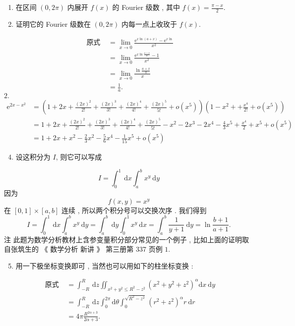 \documentclass[10pt]{article}
\begin{document}
\begin{enumerate}
  \item  在区间  $(0,2 \pi)$  内展开  $f(x)$  的  Fourier  级数 ,  其中  $f(x)=\frac{\pi-x}{2}$.

  \item  证明它的  Fourier  级数在  $(0,2 \pi)$  内每一点上收玫于  $f(x)$.

\end{enumerate}
$$
\begin{aligned}
\text { 原式 } &=\lim _{x \rightarrow 0} \frac{\mathrm{e}^{x \ln (a+x)}-\mathrm{e}^{x \ln }}{x^{2}} \\
&=\lim _{x \rightarrow 0} \frac{\mathrm{e}^{x \ln \frac{a+x}{a}}-1}{x^{2}} \\
&=\lim _{x \rightarrow 0} \frac{\ln \frac{a+x}{a}}{x} \\
&=\frac{1}{a} .
\end{aligned}
$$
$2 .$
$$
\begin{aligned}
\mathrm{e}^{2 x-x^{2}} &=\left(1+2 x+\frac{(2 x)^{2}}{2 !}+\frac{(2 x)^{3}}{3 !}+\frac{(2 x)^{4}}{4 !}+\frac{(2 x)^{5}}{5 !}+o\left(x^{5}\right)\right)\left(1-x^{2}++\frac{x^{4}}{2 !}+o\left(x^{5}\right)\right) \\
&=1+2 x+\frac{(2 x)^{2}}{2 !}+\frac{(2 x)^{3}}{3 !}+\frac{(2 x)^{4}}{4 !}+\frac{(2 x)^{5}}{5 !}-x^{2}-2 x^{3}-2 x^{4}-\frac{4}{3} x^{5}+\frac{x^{4}}{2}+x^{5}+o\left(x^{5}\right) \\
&=1+2 x+x^{2}-\frac{2}{3} x^{2}-\frac{5}{6} x^{4}-\frac{1}{15} x^{5}+o\left(x^{5}\right)
\end{aligned}
$$

\begin{enumerate}
  \setcounter{enumi}{3}
  \item  设这积分为  $I$,  则它可以写成 
\end{enumerate}
$$
I=\int_{0}^{1} \mathrm{~d} x \int_{a}^{b} x^{y} \mathrm{~d} y
$$
 因为 
$$
f(x, y)=x^{y}
$$
 在  $[0,1] \times[a, b]$  连续 ,  所以两个积分号可以交换次序 .  我们得到 
$$
I=\int_{0}^{1} \mathrm{~d} x \int_{a}^{b} x^{y} \mathrm{~d} y=\int_{a}^{b} \mathrm{~d} y \int_{0}^{1} x^{y} \mathrm{~d} x=\int_{a}^{b} \frac{1}{y+1} \mathrm{~d} y=\ln \frac{b+1}{a+1} .
$$
 注   此题为数学分析教材上含参变量积分部分常见的一个例子 ,  比如上面的证明取自张筑生的  《 数学分析   新讲 》 第三册第  337  页例  $1 .$

\begin{enumerate}
  \setcounter{enumi}{4}
  \item  用一下极坐标变换即可 ,  当然也可以用如下的柱坐标变换 :
\end{enumerate}
$$
\begin{aligned}
\text { 原式 } &=\int_{-R}^{R} \mathrm{~d} z \iint_{x^{2}+y^{2} \leqslant R^{2}-z^{2}}\left(x^{2}+y^{2}+z^{2}\right)^{\alpha} \mathrm{d} x \mathrm{~d} y \\
&=\int_{-R}^{R} \mathrm{~d} z \int_{0}^{2 \pi} \mathrm{d} \theta \int_{0}^{\sqrt{R^{2}-z^{2}}}\left(r^{2}+z^{2}\right)^{\alpha} r \mathrm{~d} r \\
&=4 \pi \frac{R^{2 \alpha+3}}{2 \alpha+3} .
\end{aligned}
$$
\end{document}
